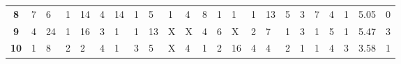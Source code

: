 \begin{table}[t]
\begin{adjustbox}{width=\textwidth}
\begin{tabular}{|c|llllllllllllllllllll|c|c|}
\textbf{8}           & {\color{blue} 7}  & {\color{blue} 6}                      & {\color{blue} 1}                      & {\color{blue} 14}                     & {\color{blue} 4}                      & {\color{blue} 14}                     & {\color{blue} 1}  & {\color{blue} 5}                      & {\color{blue} 1}                      & {\color{blue} 4}                      & {\color{blue} 8}                      & {\color{blue} 1}                      & {\color{blue} 1}                      & {\color{blue} 1}                      & {\color{blue} 13}                     & {\color{blue} 5}                      & {\color{blue} 3}                      & {\color{blue} 7}                      & {\color{blue} 4}                      & {\color{blue} 1}                      & 5.05                                                & 0                                                   \\
\textbf{9}           & {\color{blue} 4}  & {\color{blue} 24}                     & {\color{blue} 1}                      & {\color{blue} 16}                     & {\color{blue} 3}                      & {\color{blue} 1}                      & {\color{blue} 1}  & {\color{blue} 13}                     & {\color{red} X} & {\color{red} X} & {\color{blue} 4}                      & {\color{blue} 6}                      & {\color{red} X} & {\color{blue} 2}                      & {\color{blue} 7}                      & {\color{blue} 1}                      & {\color{blue} 3}                      & {\color{blue} 1}                      & {\color{blue} 5}                      & {\color{blue} 1}                      & 5.47                                                & 3                                                   \\
\textbf{10}          & {\color{blue} 1}  & {\color{blue} 8}                      & {\color{blue} 2}                      & {\color{blue} 2}                      & {\color{blue} 4}                      & {\color{blue} 1}                      & {\color{blue} 3}  & {\color{blue} 5}                      & {\color{red} X} & {\color{blue} 4}                      & {\color{blue} 1}                      & {\color{blue} 2}                      & {\color{blue} 16}                     & {\color{blue} 4}                      & {\color{blue} 4}                      & {\color{blue} 2}                      & {\color{blue} 1}                      & {\color{blue} 1}                      & {\color{blue} 4}                      & {\color{blue} 3}                      & 3.58                                                & 1                                                   \\

\end{tabular}
\end{adjustbox}
\end{table}
